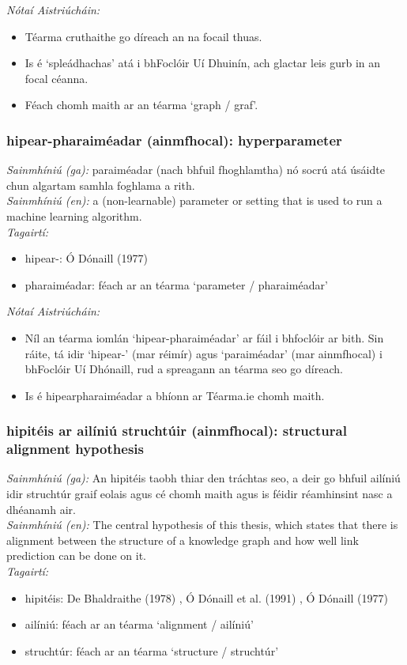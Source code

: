  \noindent \textit{Nótaí Aistriúcháin:}
\begin{itemize}
	\item Téarma cruthaithe go díreach an na focail thuas.
	\item Is é `spleádhachas' atá i bhFoclóir Uí Dhuinín, ach glactar leis gurb in an focal céanna.
	\item Féach chomh maith ar an téarma `graph / graf'.
\end{itemize}


\subsubsection*{hipear-pharaiméadar (ainmfhocal): hyperparameter}
 \noindent \textit{Sainmhíniú (ga):} paraiméadar (nach bhfuil fhoghlamtha) nó socrú atá úsáidte chun algartam samhla foghlama a rith.
\\
 \noindent \textit{Sainmhíniú (en):} a (non-learnable) parameter or setting that is used to run a machine learning algorithm.
\\
 \noindent \textit{Tagairtí:}
\begin{itemize}
	\item hipear-: Ó Dónaill (1977) \cite{odonaill}
	\item pharaiméadar: féach ar an téarma `parameter / pharaiméadar'
\end{itemize}

 \noindent \textit{Nótaí Aistriúcháin:}
\begin{itemize}
	\item Níl an téarma iomlán `hipear-pharaiméadar' ar fáil i bhfoclóir ar bith. Sin ráite, tá idir `hipear-' (mar réimír) agus `paraiméadar' (mar ainmfhocal) i bhFoclóir Uí Dhónaill, rud a spreagann an téarma seo go díreach.
	\item Is é hipearpharaiméadar a bhíonn ar Téarma.ie chomh maith.
\end{itemize}


\subsubsection*{hipitéis ar ailíniú struchtúir (ainmfhocal): structural alignment hypothesis}
 \noindent \textit{Sainmhíniú (ga):} An hipitéis taobh thiar den tráchtas seo, a deir go bhfuil ailíniú idir struchtúr graif eolais agus cé chomh maith agus is féidir réamhinsint nasc a dhéanamh air.
\\
 \noindent \textit{Sainmhíniú (en):} The central hypothesis of this thesis, which states that there is alignment between the structure of a knowledge graph and how well link prediction can be done on it.
\\
 \noindent \textit{Tagairtí:}
\begin{itemize}
	\item hipitéis: De Bhaldraithe (1978) \cite{de-bhaldraithe}, Ó Dónaill et al. (1991) \cite{focloir-beag}, Ó Dónaill (1977) \cite{odonaill}
	\item ailíniú: féach ar an téarma `alignment / ailíniú'
	\item struchtúr: féach ar an téarma `structure / struchtúr'
\end{itemize}

